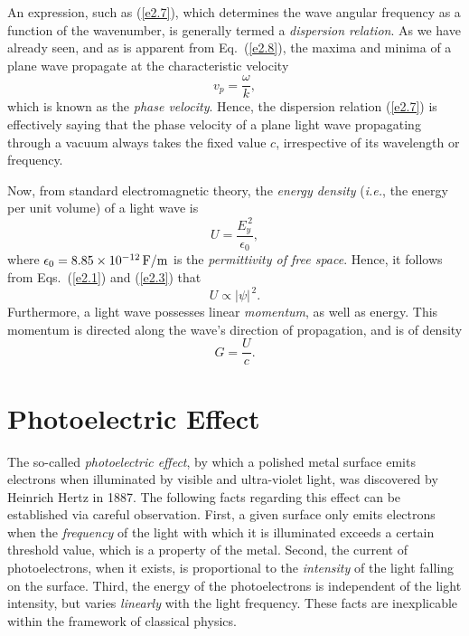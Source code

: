 An expression, such as  (\ref{e2.7}), which determines the wave angular frequency
as a function of the wavenumber, is generally termed a {\em dispersion
relation}. As we have already seen, and as is apparent from Eq.~(\ref{e2.8}),  the maxima and minima of a plane wave
propagate at the characteristic velocity
\begin{equation}
v_p = \frac{\omega}{k},
\end{equation}
which is known as the {\em phase velocity}. Hence,  the dispersion relation (\ref{e2.7})  is effectively saying that the phase velocity of a plane light wave propagating through a vacuum always takes the fixed value $c$, irrespective
of its wavelength or frequency. 

Now, from standard electromagnetic theory, the {\em energy density}\/ ({\em i.e.}, the energy per unit volume) of a
light wave is
\begin{equation}
U = \frac{E_y^{\,2}}{\epsilon_0},
\end{equation}
where $\epsilon_0= 8.85\times 10^{-12}\,{\rm F/m}$ is the {\em permittivity
of free space}. Hence, it follows from Eqs.~(\ref{e2.1}) and (\ref{e2.3}) that
\begin{equation}\label{e2.10}
U \propto |\psi|^{\,2}.
\end{equation}
Furthermore, a light wave  possesses linear  {\em momentum}, as well
as energy. This momentum is directed along the wave's direction of propagation, and is of density
\begin{equation}\label{e2.11}
G = \frac{U}{c}.
\end{equation}

\section{Photoelectric Effect}\label{s3.3}
The so-called {\em photoelectric effect}, by which a polished metal surface emits electrons
when illuminated by visible and ultra-violet light, was discovered by Heinrich Hertz in 1887.
The following facts regarding this effect can be established via careful
observation. First, a given surface only emits electrons when the {\em frequency}\/
of the light with which it is illuminated exceeds a certain threshold value,
which is a property of the metal. Second, the current of photoelectrons, when it
exists, is proportional to the {\em intensity}\/ of the light falling on the surface. 
Third, the energy of the photoelectrons is independent of the light intensity,
but varies {\em linearly}\/ with the light frequency. These facts are
inexplicable within the framework of classical physics.

